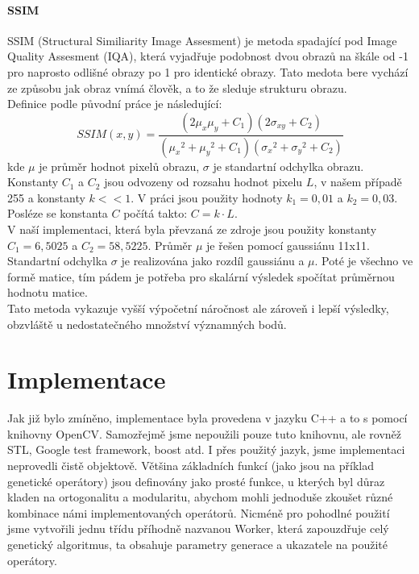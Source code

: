 \documentclass[a4paper,11pt,titlepage]{scrartcl}
\begin{document}
\paragraph{SSIM}
SSIM (Structural Similiarity Image Assesment) je metoda spadající pod Image Quality Assesment (IQA), která vyjadřuje podobnost dvou obrazů na škále od -1 pro naprosto odlišné obrazy po 1 pro identické obrazy. Tato medota bere vychází ze způsobu jak obraz vnímá člověk, a to že sleduje strukturu obrazu.\\
Definice podle původní práce\cite{ssim} je následující:
\begin{equation}
    SSIM(x,y) = \frac{(2 \mu_x \mu_y + C_1)(2 \sigma_{xy} + C_2)}{({\mu_x}^2 + {\mu_y}^2 + C_1)({\sigma_x}^2 + {\sigma_y}^2 + C_2)}
\end{equation}
kde $\mu$ je průměr hodnot pixelů obrazu, $\sigma$ je standartní odchylka obrazu. Konstanty $C_1$ a $C_2$ jsou odvozeny od rozsahu hodnot pixelu $L$, v našem případě 255 a konstanty $k << 1$. V práci jsou použity hodnoty $k_1 = 0,01$ a $k_2 = 0,03$. Posléze se konstanta $C$ počítá takto: $C = k \cdot L$.\\
V naší implementaci, která byla převzaná ze zdroje \cite{ssim-src} jsou použity konstanty $C_1 = 6,5025$ a $C_2 = 58,5225$. Průměr $\mu$ je řešen pomocí gaussiánu 11x11. Standartní odchylka $\sigma$ je realizována jako rozdíl gaussiánu a $\mu$. Poté je všechno ve formě matice, tím pádem je potřeba pro skalární výsledek spočítat průměrnou hodnotu matice.\\
Tato metoda vykazuje vyšší výpočetní náročnost ale zároveň i lepší výsledky, obzvláště u nedostatečného množství významných bodů.

\section{Implementace}
Jak již bylo zmíněno, implementace byla provedena v jazyku C++ a to s pomocí knihovny OpenCV. Samozřejmě jsme nepoužili pouze tuto knihovnu, ale rovněž STL, Google test framework, boost atd. I přes použitý jazyk, jsme implementaci neprovedli čistě objektově. Většina základních funkcí (jako jsou na příklad genetické operátory) jsou definovány jako prosté funkce, u kterých byl důraz kladen na ortogonalitu a modularitu, abychom mohli jednoduše zkoušet různé kombinace námi implementovaných operátorů. Nicméně pro pohodlné použití jsme vytvořili jednu třídu příhodně nazvanou Worker, která zapouzdřuje celý genetický algoritmus, ta obsahuje parametry generace a ukazatele na použité operátory.
\end{document}
